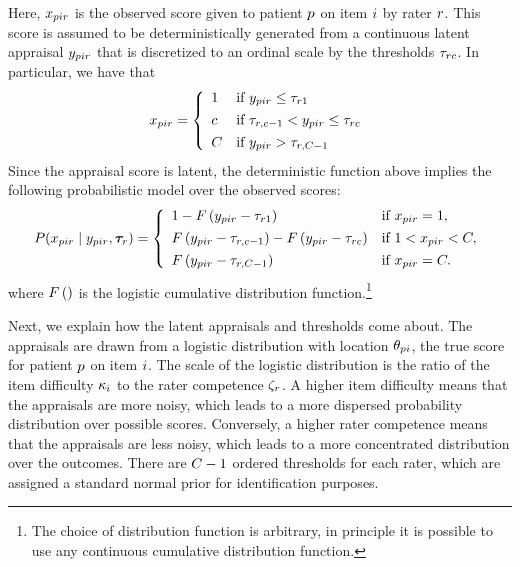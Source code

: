 \documentclass[a4paper,11pt]{article}
\begin{document}
Here, $x_{pir}$ is the observed score given to patient $p$ on item $i$ by rater $r$.
This score is assumed to be deterministically generated from a continuous latent appraisal $y_{pir}$ that is discretized to an ordinal scale by the thresholds $\tau_{rc}$.
In particular, we have that
\begin{align*}
\oneScore =
\left\{\begin{array}{ll}
1		& \text{if }  \Appraisal_{\Ipatient\Iitem\Irater} \leq \Threshold_{\Irater 1} \\[4pt]
\Incat	& \text{if }  \Threshold_{\Irater, \Incat - 1} < \Appraisal_{\Ipatient\Iitem\Irater} \leq \Threshold_{\Irater\Incat} \\[4pt]
\Tncat	& \text{if }  \Appraisal_{\Ipatient\Iitem\Irater} > \Threshold_{\Irater,\Tncat-1}
\end{array} \right.
\end{align*}
Since the appraisal score is latent, the deterministic function above implies the following probabilistic model over the observed scores:
\begin{align*}
P(\oneScore\mid \oneAppraisal,\bm{\Threshold}_{\Irater}) =
\left\{\begin{array}{ll}
1 - \cdf{\Appraisal_{\Ipatient\Iitem\Irater} - \Threshold_{\Irater 1}}         & \text{if } \oneScore = 1, \\[4pt]
\cdf{\oneAppraisal - \Threshold_{\Irater,\Incat-1}} -
\cdf{\oneAppraisal - \Threshold_{\Irater\Incat}}         & \text{if } 1 < \oneScore < \Tncat,\\[4pt]
\cdf{\oneAppraisal - \Threshold_{\Irater,\Tncat-1}}       & \text{if } \oneScore = \Tncat.
\end{array} \right.
\end{align*}
where $F\left(\right)$ is the logistic cumulative distribution function.\footnote{%
	The choice of distribution function is arbitrary, in principle it is possible to use any continuous cumulative distribution function.
}

Next, we explain how the latent appraisals and thresholds come about.
The appraisals are drawn from a logistic distribution with location $\theta_{pi}$, the true score for patient $p$ on item $i$. The scale of the logistic distribution is the ratio of the item difficulty $\kappa_i$ to the rater competence $\zeta_r$.
A higher item difficulty means that the appraisals are more noisy, which leads to a more dispersed probability distribution over possible scores.
Conversely, a higher rater competence means that the appraisals are less noisy, which leads to a more concentrated distribution over the outcomes.
There are $\Tncat - 1$ ordered thresholds for each rater, which are assigned a standard normal prior for identification purposes.
\end{document}
